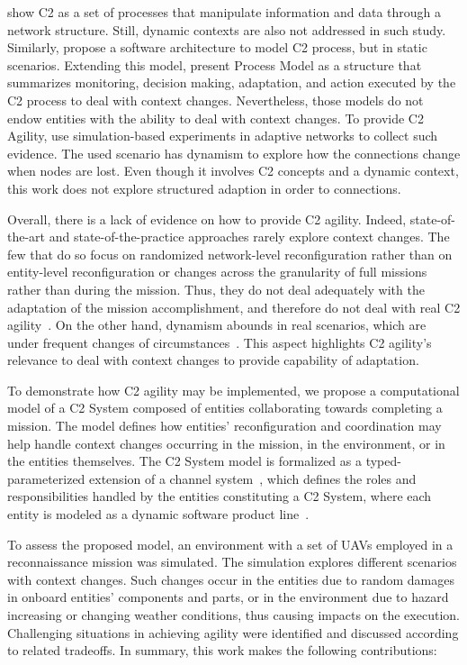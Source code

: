 \citet{Swart2012} show C2 as a set of processes that manipulate information and data through a network structure. Still, dynamic contexts are also not addressed in such study. Similarly, \citet{Mason2001} propose a software architecture to model C2 process, but in static scenarios. Extending this model, \citet{Stanton2007} present Process Model as a structure that summarizes  monitoring, decision making, adaptation, and action executed by the C2 process to deal with context changes. Nevertheless, those models do not endow entities with the ability to deal with context changes. To provide C2 Agility, \citet{c2-02} use simulation-based experiments in adaptive networks to collect such evidence. The used scenario has dynamism to explore how the connections change when nodes are lost. Even though it involves C2 concepts and a dynamic context, this work does not explore structured adaption in order to  connections.


Overall,  there is a lack of evidence on how to provide C2 agility. Indeed, state-of-the-art and state-of-the-practice approaches rarely explore context changes. The few that do so focus on randomized network-level reconfiguration rather than on entity-level reconfiguration or changes across the granularity of full missions rather than during the mission. Thus, they do not deal adequately with the adaptation of the mission accomplishment, and therefore do not deal with real C2 agility~\citep{FRANCE2014,Alberts2017,c2-02,Alberts2011, nato01}. On the other hand, dynamism abounds in real scenarios, which are \color{black}under frequent changes of circumstances~\citep{c2-02}. \color{black}This aspect highlights C2 agility's relevance to deal with context changes to provide capability of adaptation. 

To demonstrate how C2 agility may be \color{black}implemented\color{black}, we propose a computational model of a C2 System composed of entities collaborating towards completing a mission. The model defines how entities' reconfiguration and coordination may help handle context changes occurring in the mission, in the environment, or in the entities themselves. The C2 System model is formalized as a typed-parameterized extension of a channel system~\citep{MC01}, which defines the roles and responsibilities handled by the entities constituting a C2 System, where each entity is modeled as a dynamic software product line~\citep{Bencomo2008}.

To assess the proposed model, an environment with a set of UAVs \color{black}employed \color{black} in a reconnaissance mission was simulated. The simulation explores different scenarios with context changes. Such changes occur in the entities due to random damages in onboard  entities’ components and parts, or in the environment due to hazard increasing or \color{black}changing weather conditions\color{black}, thus causing impacts on the execution. Challenging situations in achieving agility were identified and discussed according to related tradeoffs. In summary, this work makes the following contributions:

